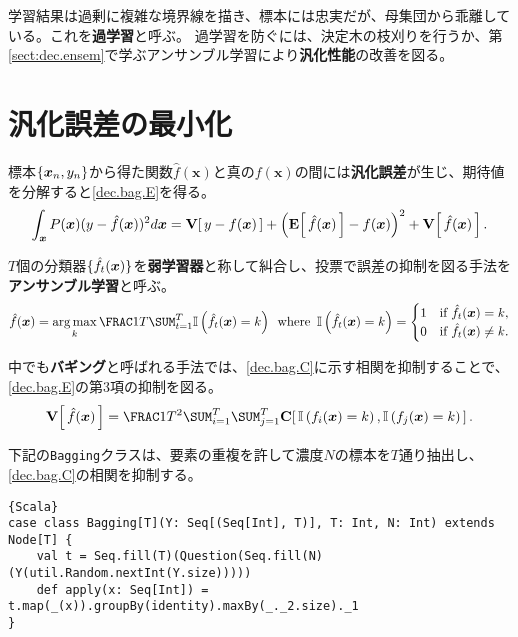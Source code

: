 \documentclass[10pt,a4paper]{book}
\begin{document}
学習結果は過剰に複雑な境界線を描き、標本には忠実だが、母集団から乖離している。これを\textbf{過学習}と呼ぶ。
過学習を防ぐには、決定木の枝刈りを行うか、第\ref{sect:dec.ensem}で学ぶアンサンブル学習により\textbf{汎化性能}の改善を図る。

\section{汎化誤差の最小化\label{sect:dec.ensem}}

標本$\seq{\bm{x}_n,y_n}$から得た関数$\hat{f}(\bm{x})$と真の$f(\bm{x})$の間には\textbf{汎化誤差}が生じ、期待値を分解すると\eqref{dec.bag.E}を得る。
%
\begin{equation}
\label{eq:dec.bag.E}
\int_{\bm{x}}P(\bm{x})(y-\hat{f}(\bm{x}))^2d\bm{x} = \Var{y-f(\bm{x})} + \left(\E{\hat{f}(\bm{x})} - f(\bm{x})\right)^2 + \Var{\hat{f}(\bm{x})}.
\end{equation}

$T$個の分類器$\seq{\hat{f}_t(\bm{x})}$を\textbf{弱学習器}と称して糾合し、投票で誤差の抑制を図る手法を\textbf{アンサンブル学習}と呼ぶ。
%
\begin{equation}
\label{eq:dec.bag.f}
\hat{f}(\bm{x}) = \argmax_k \frac{1}{T} \sum_{t=1}^T \Ii{\hat{f}_t(\bm{x})=k}
\where \Ii{\hat{f}_t(\bm{x})=k} =
\begin{cases}
1 & \text{if $\hat{f}_t(\bm{x})=k$}, \\
0 & \text{if $\hat{f}_t(\bm{x})\neq k$}.
\end{cases}
\end{equation}

中でも\textbf{バギング}と呼ばれる手法では、\eqref{dec.bag.C}に示す相関を抑制することで、\eqref{dec.bag.E}の第3項の抑制を図る。
%
\begin{equation}
\label{eq:dec.bag.C}
\Var{\hat{f}(\bm{x})} = \frac{1}{T^2}\sum_{i=1}^T \sum_{j=1}^T \Cov{\Ii{f_i(\bm{x})=k},\Ii{f_j(\bm{x})=k}}.
\end{equation}

下記の\texttt{Bagging}クラスは、要素の重複を許して濃度$N$の標本を$T$通り抽出し、\eqref{dec.bag.C}の相関を抑制する。

\begin{Verbatim}{Scala}
case class Bagging[T](Y: Seq[(Seq[Int], T)], T: Int, N: Int) extends Node[T] {
	val t = Seq.fill(T)(Question(Seq.fill(N)(Y(util.Random.nextInt(Y.size)))))
	def apply(x: Seq[Int]) = t.map(_(x)).groupBy(identity).maxBy(_._2.size)._1
}
\end{Verbatim}
\end{document}
